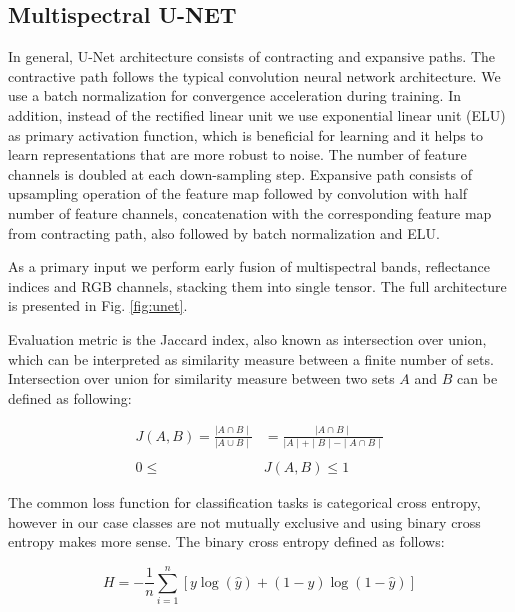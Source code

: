 \documentclass[10pt,twocolumn,letterpaper]{article}
\begin{document}
\subsection{Multispectral U-NET}

In general, U-Net architecture consists of contracting and expansive paths. The contractive path follows the typical convolution neural network architecture.
We use a batch normalization \cite{batchnorm} for convergence acceleration during training. In addition, instead of the rectified linear unit we use exponential linear unit (ELU) \cite{elu} as primary activation function, which is beneficial for learning and it helps to learn representations that are more robust to noise. The number of feature channels is doubled at each down-sampling step. Expansive path consists of upsampling operation of the feature map followed by convolution with half number of feature channels, concatenation with the corresponding feature map from contracting path, also followed by batch normalization and ELU.

As a primary input we perform early fusion of multispectral bands, reflectance indices and RGB channels, stacking them into single tensor. The full architecture is presented in Fig. \ref{fig:unet}.


Evaluation metric is the Jaccard index, also known as intersection over union, which can be interpreted as similarity  measure between a finite number of sets. Intersection over union for similarity measure between two sets $A$ and $B$ can be defined as following:

\begin{equation}
\begin{aligned}
J(A, B) = \frac{\mid A \cap B \mid }{\mid A \cup B \mid} &= \frac{\mid A \cap B \mid}{\mid A \mid + \mid B \mid - \mid A \cap B \mid} \\ \\
0 \le & J(A, B) \le 1
\end{aligned}
\end{equation}

The common loss function for classification tasks is categorical cross entropy, however in our case classes are not mutually exclusive and using binary cross entropy makes more sense. The binary cross entropy defined as follows:

\begin{equation} \label{eq:bintropy}
H = -\frac{1}{n}\sum_{i=1}^n{[y \log(\widehat{y})+(1-y)\log(1-\widehat{y})]}
\end{equation}
\end{document}
